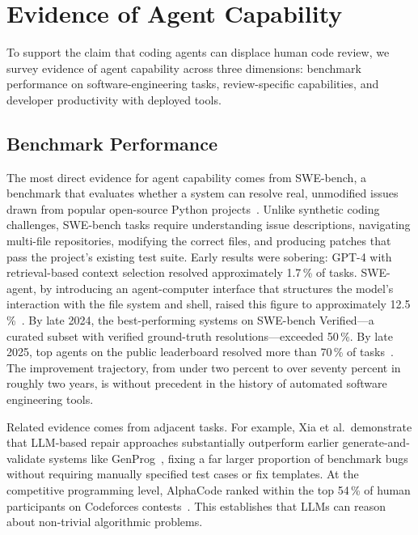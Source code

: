 \documentclass[10pt,conference]{IEEEtran}
\begin{document}
\section{Evidence of Agent Capability}
\label{sec:capability}

To support the claim that coding agents can displace human code review, we survey evidence of agent capability across three dimensions: benchmark performance on software-engineering tasks, review-specific capabilities, and developer productivity with deployed tools.

\subsection{Benchmark Performance}

The most direct evidence for agent capability comes from SWE-bench, a benchmark that evaluates whether a system can resolve real, unmodified issues drawn from popular open-source Python projects~\cite{jimenez2024swebench}.
Unlike synthetic coding challenges, SWE-bench tasks require understanding issue descriptions, navigating multi-file repositories, modifying the correct files, and producing patches that pass the project's existing test suite.
Early results were sobering: GPT-4 with retrieval-based context selection resolved approximately 1.7\,\% of tasks.
SWE-agent, by introducing an agent-computer interface that structures the model's interaction with the file system and shell, raised this figure to approximately 12.5\,\%~\cite{yang2024sweagent}.
By late 2024, the best-performing systems on SWE-bench Verified—a curated subset with verified ground-truth resolutions—exceeded 50\,\%.
By late 2025, top agents on the public leaderboard resolved more than 70\,\% of tasks~\cite{swebench2025leaderboard}.
The improvement trajectory, from under two percent to over seventy percent in roughly two years, is without precedent in the history of automated software engineering tools.

Related evidence comes from adjacent tasks.
For example, Xia et al.\ demonstrate that LLM-based repair approaches substantially outperform earlier generate-and-validate systems like GenProg~\cite{le2012genprog,xia2023automated}, fixing a far larger proportion of benchmark bugs without requiring manually specified test cases or fix templates.
At the competitive programming level, AlphaCode ranked within the top 54\,\% of human participants on Codeforces contests~\cite{li2022competition}. This establishes that LLMs can reason about non-trivial algorithmic problems.
\end{document}
